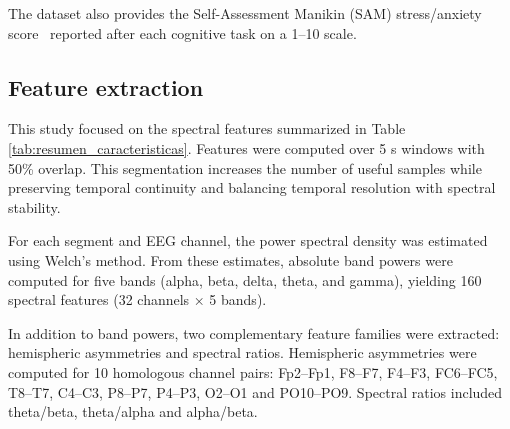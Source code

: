 \documentclass[lettersize,journal]{IEEEtran}
\begin{document}
The dataset also provides the Self-Assessment Manikin (SAM) stress/anxiety score~\cite{Bradley1994} reported after each cognitive task on a 1–10 scale.

\subsection{Feature extraction}
This study focused on the spectral features summarized in Table \ref{tab:resumen_caracteristicas}.
Features were computed over 5 s windows with 50\% overlap. This segmentation increases the number of useful samples while preserving temporal continuity and balancing temporal resolution with spectral stability.

 \begin{table}[!htbp]
	\centering
	\caption{Spectral features, organized by type, considered in this study.}
	\label{tab:resumen_caracteristicas}
	\small
	\renewcommand{\arraystretch}{1.2}
	{
	}
 \end{table}

For each segment and EEG channel, the power spectral density was estimated using Welch's method. From these estimates, absolute band powers were computed for five bands (alpha, beta, delta, theta, and gamma), yielding 160 spectral features (32 channels × 5 bands).

In addition to band powers, two complementary feature families were extracted: hemispheric asymmetries and spectral ratios. Hemispheric asymmetries were computed for 10 homologous channel pairs: Fp2–Fp1, F8–F7, F4–F3, FC6–FC5, T8–T7, C4–C3, P8–P7, P4–P3, O2–O1 and PO10–PO9. Spectral ratios included theta/beta, theta/alpha and alpha/beta.
\end{document}
